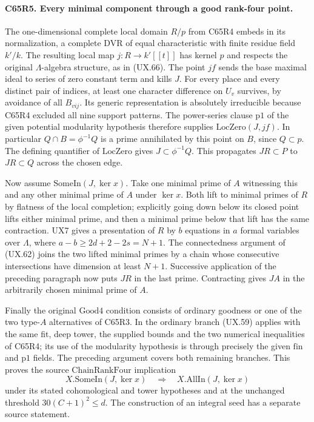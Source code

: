 \paragraph{C65R5. Every minimal component through a good rank-four point.}
The one-dimensional complete local domain $R/p$ from C65R4 embeds
in its normalization, a complete DVR of equal characteristic
with finite residue field $k'/k$. The resulting local map
$j:R\to k'[[t]]$ has kernel $p$ and respects the original
$\Lambda$-algebra structure, as in (UX.66). The point $jf$ sends
the base maximal ideal to series of zero constant term and kills
$J$. For every place and every distinct pair of indices, at least
one character difference on $U_v$ survives, by avoidance of all
$B_{vij}$. Its generic representation is absolutely irreducible
because C65R4 excluded all nine support patterns. The power-series
clause $\mathrm{p1}$ of the given potential modularity hypothesis
therefore supplies $\mathrm{LocZero}(J,jf)$. In particular
$Q\cap B=\phi^{-1}Q$ is a prime annihilated by this point on $B$,
since $Q\subset p$. The defining quantifier of $\mathrm{LocZero}$
gives $J\subset\phi^{-1}Q$. This propagates $JR\subset P$ to
$JR\subset Q$ across the chosen edge.

Now assume $\mathrm{SomeIn}(J,\ker x)$. Take one minimal prime of
$A$ witnessing this and any other minimal prime of $A$ under
$\ker x$. Both lift to minimal primes of $R$ by flatness of the
local completion; explicitly going down below its closed point lifts
either minimal prime, and then a minimal prime below that lift has the
same contraction. UX7 gives a presentation of $R$ by $b$ equations
in $a$ formal variables over $\Lambda$, where
$a-b\ge2d+2-2s=N+1$. The connectedness argument of (UX.62)
joins the two lifted minimal primes by a chain whose consecutive
intersections have dimension at least $N+1$. Successive application
of the preceding paragraph now puts $JR$ in the last prime.
Contracting gives $JA$ in the arbitrarily chosen minimal prime
of $A$.

Finally the original $\mathrm{Good4}$ condition consists of ordinary
goodness or one of the two type-$A$ alternatives of C65R3. In the
ordinary branch (UX.59) applies with the same fit, deep tower,
the supplied bounds and the two numerical inequalities of C65R4;
its use of the modularity hypothesis is through precisely the given
$\mathrm{fin}$ and $\mathrm{p1}$ fields. The preceding argument covers
both remaining branches. This proves the source
$\mathrm{ChainRankFour}$ implication
\[
       X.\mathrm{SomeIn}(J,\ker x)
          \quad\Longrightarrow\quad X.\mathrm{AllIn}(J,\ker x)
\]
under its stated cohomological and tower hypotheses and at the
unchanged threshold $30(C+1)^2\le d$. The construction of an
integral seed has a separate source statement.
